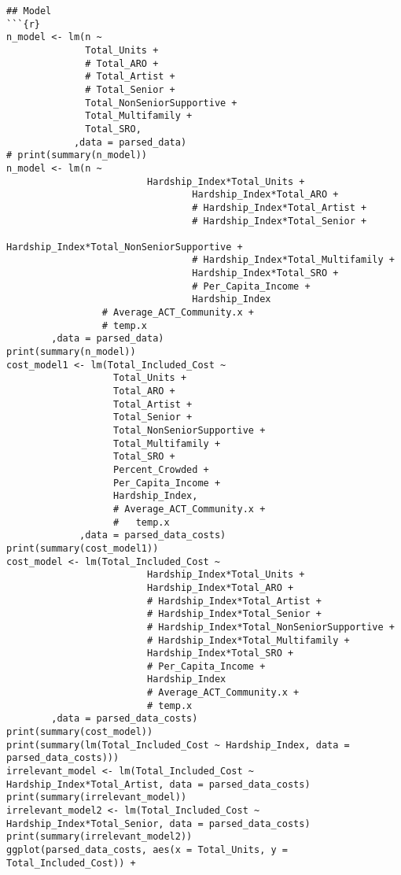 \documentclass{article}
\begin{document}
\begin{verbatim}
## Model
```{r}
n_model <- lm(n ~
              Total_Units +
              # Total_ARO +
              # Total_Artist +
              # Total_Senior +
              Total_NonSeniorSupportive +
              Total_Multifamily +
              Total_SRO,
            ,data = parsed_data)
# print(summary(n_model))
n_model <- lm(n ~
                         Hardship_Index*Total_Units +
                                 Hardship_Index*Total_ARO +
                                 # Hardship_Index*Total_Artist +
                                 # Hardship_Index*Total_Senior +
                                 Hardship_Index*Total_NonSeniorSupportive +
                                 # Hardship_Index*Total_Multifamily +
                                 Hardship_Index*Total_SRO +
                                 # Per_Capita_Income +
                                 Hardship_Index
                 # Average_ACT_Community.x +
                 # temp.x
        ,data = parsed_data)
print(summary(n_model))
cost_model1 <- lm(Total_Included_Cost ~
                   Total_Units +
                   Total_ARO +
                   Total_Artist +
                   Total_Senior +
                   Total_NonSeniorSupportive +
                   Total_Multifamily +
                   Total_SRO +
                   Percent_Crowded +
                   Per_Capita_Income +
                   Hardship_Index,
                   # Average_ACT_Community.x +
                   #   temp.x
             ,data = parsed_data_costs)
print(summary(cost_model1))
cost_model <- lm(Total_Included_Cost ~
                         Hardship_Index*Total_Units +
                         Hardship_Index*Total_ARO +
                         # Hardship_Index*Total_Artist +
                         # Hardship_Index*Total_Senior +
                         # Hardship_Index*Total_NonSeniorSupportive +
                         # Hardship_Index*Total_Multifamily +
                         Hardship_Index*Total_SRO +
                         # Per_Capita_Income +
                         Hardship_Index
                         # Average_ACT_Community.x +
                         # temp.x
        ,data = parsed_data_costs)
print(summary(cost_model))
print(summary(lm(Total_Included_Cost ~ Hardship_Index, data = parsed_data_costs)))
irrelevant_model <- lm(Total_Included_Cost ~ Hardship_Index*Total_Artist, data = parsed_data_costs)
print(summary(irrelevant_model))
irrelevant_model2 <- lm(Total_Included_Cost ~ Hardship_Index*Total_Senior, data = parsed_data_costs)
print(summary(irrelevant_model2))
ggplot(parsed_data_costs, aes(x = Total_Units, y = Total_Included_Cost)) +

\end{verbatim}
\end{document}
